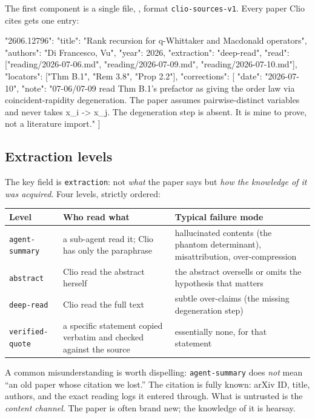 \documentclass[11pt,a4paper]{article}
\newcommand{\level}[1]{\texttt{#1}}
\begin{document}
The first component is a single file,
, format \texttt{clio-sources-v1}. Every
paper Clio cites gets one entry:

\begin{code}
"2606.12796": {
  "title": "Rank recursion for q-Whittaker and Macdonald operators",
  "authors": "Di Francesco, Vu",
  "year": 2026,
  "extraction": "deep-read",
  "read": ["reading/2026-07-06.md", "reading/2026-07-09.md",
           "reading/2026-07-10.md"],
  "locators": ["Thm B.1", "Rem 3.8", "Prop 2.2"],
  "corrections": [
    { "date": "2026-07-10",
      "note": "07-06/07-09 read Thm B.1's prefactor as giving the
       order law via coincident-rapidity degeneration. The paper
       assumes pairwise-distinct variables and never takes
       x_i -> x_j. The degeneration step is absent. It is mine
       to prove, not a literature import." } ]
}
\end{code}

\subsection{Extraction levels}

The key field is \texttt{extraction}: not \emph{what} the paper says but
\emph{how the knowledge of it was acquired}. Four levels, strictly ordered:

\begin{center}
\begin{tabular}{@{}llp{7.6cm}@{}}
\toprule
Level & Who read what & Typical failure mode \\
\midrule
\level{agent-summary} & a sub-agent read it; Clio has only the
  paraphrase & hallucinated contents (the phantom determinant),
  misattribution, over-compression \\
\level{abstract} & Clio read the abstract herself & the abstract
  oversells or omits the hypothesis that matters \\
\level{deep-read} & Clio read the full text & subtle over-claims
  (the missing degeneration step) \\
\level{verified-quote} & a specific statement copied verbatim and
  checked against the source & essentially none, for that statement \\
\bottomrule
\end{tabular}
\end{center}

A common misunderstanding is worth dispelling: \level{agent-summary} does
\emph{not} mean ``an old paper whose citation we lost.'' The citation is
fully known: arXiv ID, title, authors, and the exact reading logs it entered
through. What is untrusted is the \emph{content channel}. The paper is often
brand new; the knowledge of it is hearsay.
\end{document}
